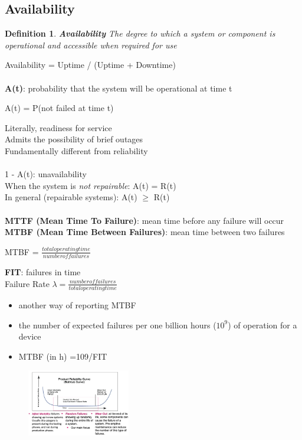 \documentclass[10pt, oneside]{article}
\newtheorem{defn}{Definition}
\begin{document}
\subsection{Availability}
\begin{defn}
    {\bf Availability} The degree to which a system or component is operational and accessible when required for use
\end{defn}Availability = Uptime / (Uptime + Downtime)\\\\{\bf A(t)}: probability that the system will be operational at time t\begin{center}
    A(t) = P(not failed at time t)
\end{center}Literally, readiness for service\\Admits the possibility of brief outages\\Fundamentally different from reliability\\\\1 - A(t): unavailability\\When the system is {\sl not repairable}: A(t) = R(t)\\ In general (repairable systems): A(t) $\geqslant$ R(t)\\\\
{\bf MTTF (Mean Time To Failure)}: mean time before any failure will occur\\
{\bf MTBF (Mean Time Between Failures)}: mean time between two failures\begin{center}
    MTBF = $\frac{total operating time}{number of failures}$
\end{center}
{\bf FIT}: failures in time\\
Failure Rate $\lambda = \frac{number of failures}{total operating time}$
\begin{itemize}
    \item another way of reporting MTBF
    \item the number of expected failures per one billion hours ($10^{9}$) of operation for a device  
    \item MTBF (in h) =109/FIT
\end{itemize}
\begin{figure}[H]
    \begin{center}
    \includegraphics[width=0.4\textwidth]{img/img84.png}
    \end{center}
\end{figure}
\end{document}
